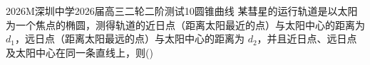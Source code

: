 
\begin{problem}{2026}{M}{深圳中学2026届高三二轮二阶测试}{10}{圆锥曲线}
某彗星的运行轨道是以太阳为一个焦点的椭圆，测得轨道的近日点（距离太阳最近的点）与太阳中心的距离为 $d_1$，远日点（距离太阳最远的点）与太阳中心的距离为 $d_2$，并且近日点、远日点及太阳中心在同一条直线上，则(\hspace{1cm})
\begin{choices}
\end{choices}
\end{problem}